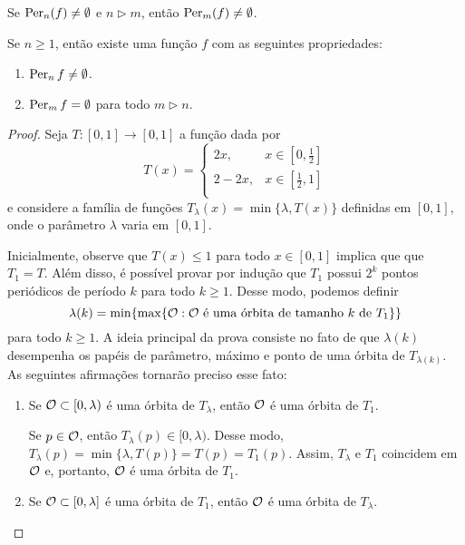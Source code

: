 \begin{theorem}[Sharkovsky]
Se $\operatorname{Per}_n(f) \neq \emptyset$ e $n \triangleright m$, então $\operatorname{Per}_m(f) \neq \emptyset$.
\end{theorem}

\begin{theorem}
Se $n \geq 1$, então existe uma função $f$ com as seguintes propriedades:
\begin{enumerate}
\item $\operatorname{Per}_n{f} \neq \emptyset$.
\item $\operatorname{Per}_m{f} =  \emptyset$ para todo $m \triangleright n$.
\end{enumerate}
\end{theorem}

\begin{proof}
Seja $T: [0,1] \to [0,1]$ a função dada por
\[ T(x) =
  \begin{cases}
    2x, & x \in \left[ 0, \frac{1}{2} \right] \\
    2 - 2x, & x \in \left[ \frac{1}{2}, 1 \right] \\
  \end{cases}
\]
e considere a família de funções $T_\lambda(x) = \min \lbrace \lambda, T(x) \rbrace$ definidas em $[0,1]$, onde o parâmetro $\lambda$ varia em $[0,1]$.

Inicialmente, observe que $T(x) \leq 1$ para todo $x \in [0,1]$ implica que que $T_1 = T$.
Além disso, é possível provar por indução que $T_1$ possui $2^k$ pontos periódicos de período $k$ para todo $k \geq 1$.
Desse modo, podemos definir
$$\lambda(k) = \min \lbrace \max \lbrace \mathcal{O} : \mathcal{O} \text{ é uma órbita de tamanho } k \text{ de } T_1 \rbrace \rbrace$$
para todo $k \geq 1$.
A ideia principal da prova consiste no fato de que $\lambda(k)$ desempenha os papéis de parâmetro, máximo e ponto de uma órbita de $T_{\lambda(k)}$. As seguintes afirmações tornarão preciso esse fato:

\begin{enumerate}[label=\alph*)]
\item Se $\mathcal{O} \subset [0, \lambda)$ é uma órbita de $T_\lambda$, então $\mathcal{O}$ é uma órbita de $T_1$.

Se $p \in \mathcal{O}$, então $T_\lambda(p) \in [0, \lambda)$.
Desse modo, $T_\lambda(p) = \min \lbrace \lambda, T(p) \rbrace = T(p) = T_1(p)$.
Assim, $T_\lambda$ e $T_1$ coincidem em $\mathcal{O}$ e, portanto, $\mathcal{O}$ é uma órbita de $T_1$.

\item Se $\mathcal{O} \subset [0, \lambda]$ é uma órbita de $T_1$, então $\mathcal{O}$ é uma órbita de $T_\lambda$.


\end{enumerate}
\end{proof}
